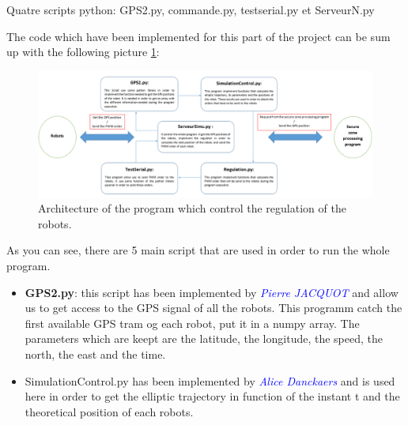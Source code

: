 

Quatre scripts python: GPS2.py, commande.py, testserial.py et ServeurN.py

The code which have been implemented for this part of the project can be sum up with the following picture \ref{fig:SyntheseCodeRegulationRobot}:

\begin{figure}[ht]
\centering
    \includegraphics[scale=0.5,angle=90]{SyntheseCodeRegulationRobot.PNG}
    \caption{Architecture of the program which control the regulation of the robots.}
    \label{fig:SyntheseCodeRegulationRobot}
\end{figure}

As you can see, there are 5 main script that are used in order to run the whole program.

\begin{itemize}
\item \textbf{GPS2.py}: this script has been implemented by \textcolor{blue}{\textit{Pierre JACQUOT}} and allow us to get access to the GPS signal of all the robots. This programm catch the first available GPS tram og each robot, put it in a numpy array. The parameters which are keept are the latitude, the longitude, the speed, the north, the east and the time.
\item SimulationControl.py has been implemented by  \textcolor{blue}{\textit{Alice Danckaers}} and is used here in order to get the elliptic trajectory in function of the instant t and the theoretical position of each robots.

\end{itemize}
\pagebreak
